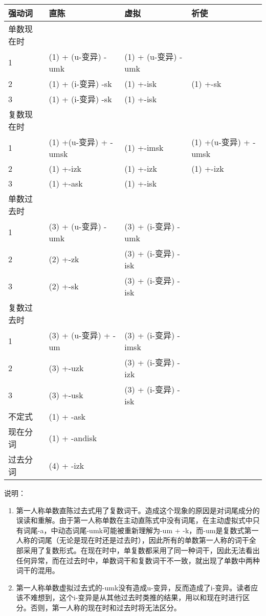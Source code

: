 \begin{longtable}{llll}
\toprule
强动词 & 直陈 & 虚拟 & 祈使 \\
\midrule
\endhead
\bottomrule
\endfoot
单数现在时 & & & \\
1 & (1) + (u-变异) -umk & (1) + (u-变异) -umk & \\
2 & (1) + (i-变异) -sk & (1) +-isk & (1) +-sk \\
3 & (1) + (i-变异) -sk & (1) +-isk & \\
复数现在时 & & & \\
1 & (1) +(u-变异) + -umsk & (1) +-imsk & (1) +(u-变异) + -umsk \\
2 & (1) +-izk & (1) +-izk & (1) +-izk \\
3 & (1) +-ask & (1) +-isk & \\
单数过去时 & & & \\
1 & (3) + (u-变异) -umk & (3) + (i-变异) -umk & \\
2 & (2) +-zk & (3) + (i-变异) -isk & \\
3 & (2) +-sk & (3) + (i-变异) -isk & \\
复数过去时 & & & \\
1 & (3) + (u-变异) + -um & (3) + (i-变异) -imsk & \\
2 & (3) +-uzk & (3) + (i-变异) -izk & \\
3 & (3) +-usk & (3) + (i-变异) -isk & \\
不定式 & (1) + -ask & & \\
现在分词 & (1) + -andisk & & \\
过去分词 & (4) + -izk & & \\
\end{longtable}

说明：

\begin{enumerate}
\def\labelenumi{\arabic{enumi})}
\item
  \label{_Ref117719619}{}第一人称单数直陈过去式用了复数词干。造成这个现象的原因是对词尾成分的误读和重解。由于第一人称单数在主动直陈式中没有词尾，在主动虚拟式中只有词尾-a，中动态词尾-umk可能被重新理解为-um
  +
  -k，而-um是复数式第一人称的词尾（无论是现在时还是过去时），因此所有的单数第一人称的词干全部采用了复数形式。在现在时中，单复数都采用了同一种词干，因此无法看出任何异常，而在过去时中，单数词干和复数词干不一致，就出现了单数中两种词干的混用。
\item
  第一人称单数虚拟过去式的-umk没有造成u-变异，反而造成了i-变异。读者应该不难想到，这个i-变异是从其他过去时类推的结果，用以和现在时进行区分。否则，第一人称的现在时和过去时将无法区分。
\end{enumerate}

